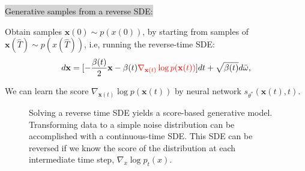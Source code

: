\documentclass[mathserif,envcountsect,compress,8pt]{beamer}
\begin{document}
\begin{frame}
	\setlength{\parskip}{0.6\baselineskip}
	\colorbox {lightgray}{{\color{blue}Generative samples from a reverse SDE:}}\\
	\vspace{20pt}
	
	Obtain samples $\mathbf{x}(0)\sim p(x(0))$,  by starting from samples of $\mathbf{x}(\hat{T})\sim p(x(\hat{T}))$, i.e,
	running the reverse-time SDE:
	\begin{equation*}
		d\mathbf{x}=[-\frac{\beta(t)}{2}\mathbf{x}-\beta(t){\color{red}\nabla_{\mathbf{x}(t)}\log p(\mathbf{x}(t))}]dt+\sqrt{\beta(t)}d\bar{\mathbf{\omega}},
		\label{2.3}
	\end{equation*}
	
	We can learn the score {\color{red}$\nabla_{\mathbf{x}(t)}\log p(\mathbf{x}(t))$} by neural network {\color{green}$s_{\theta^{*}}(\mathbf{x}(t), t)$}.
\end{frame}

\begin{frame}
	\begin{figure}[H]
		\centering
		\centering
		\caption{Solving a reverse time SDE yields a score-based generative model. Transforming
			data to a simple noise distribution can be accomplished with a continuous-time SDE.
			This SDE can be reversed if we know the score of the distribution at each intermediate time
			step, $\nabla_x\log p_t(x)$.}\label{fig_1}
	\end{figure}
	
\end{frame}
\end{document}
